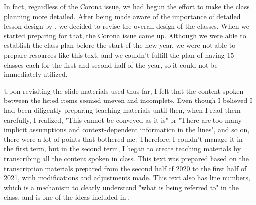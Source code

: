 In fact, regardless of the Corona issue, we had begun the effort to make the class planning more detailed. After being made aware of the importance of detailed lesson design by \textcite{Ashida2019}, we decided to revise the overall design of the classes. When we started preparing for that, the Corona issue came up. Although we were able to establish the class plan before the start of the new year, we were not able to prepare resources like this text, and we couldn't fulfill the plan of having 15 classes each for the first and second half of the year, so it could not be immediately utilized.

Upon revisiting the slide materials used thus far, I felt that the content spoken between the listed items seemed uneven and incomplete. Even though I believed I had been diligently preparing teaching materials until then, when I read them carefully, I realized, "This cannot be conveyed as it is" or "There are too many implicit assumptions and context-dependent information in the lines", and so on, there were a lot of points that bothered me. Therefore, I couldn't manage it in the first term, but in the second term, I began to create teaching materials by transcribing all the content spoken in class.
This text was prepared based on the transcription materials prepared from the second half of 2020 to the first half of 2021, with modifications and adjustments made. This text also has line numbers, which is a mechanism to clearly understand "what is being referred to" in the class, and is one of the ideas included in \textcite{Ashida2019}.

